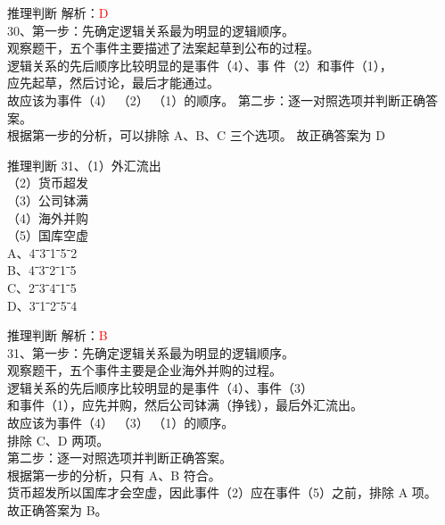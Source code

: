 \documentclass[aspectratio=169]{beamer}
\begin{document}
\begin{frame}[t]{推理判断}
    解析：\textcolor{red}{D}\\
    30、第一步：先确定逻辑关系最为明显的逻辑顺序。\\
    观察题干，五个事件主要描述了法案起草到公布的过程。\\
    逻辑关系的先后顺序比较明显的是事件（4）、事
    件（2）和事件（1），\\
    应先起草，然后讨论，最后才能通过。\\
    故应该为事件（4） （2） （1）的顺序。
    第二步：逐一对照选项并判断正确答案。\\
    根据第一步的分析，可以排除 A、B、C 三个选项。
    故正确答案为 D
\end{frame}


\begin{frame}[t]{推理判断}
    31、（1）外汇流出\\
    （2）货币超发\\
    （3）公司钵满\\
    （4）海外并购\\
    （5）国库空虚\\
    A、4ˉ3ˉ1ˉ5ˉ2\\
    B、4ˉ3ˉ2ˉ1ˉ5\\
    C、2ˉ3ˉ4ˉ1ˉ5\\
    D、3ˉ1ˉ2ˉ5ˉ4\\
\end{frame}


\begin{frame}[t]{推理判断}
    解析：\textcolor{red}{B}\\
    31、第一步：先确定逻辑关系最为明显的逻辑顺序。\\
    观察题干，五个事件主要是企业海外并购的过程。\\
    逻辑关系的先后顺序比较明显的是事件（4）、事件（3）\\
    和事件（1），应先并购，然后公司钵满（挣钱），最后外汇流出。\\
    故应该为事件（4） （3） （1）的顺序。\\
    排除 C、D 两项。\\
    第二步：逐一对照选项并判断正确答案。\\
    根据第一步的分析，只有 A、B 符合。\\
    货币超发所以国库才会空虚，因此事件（2）应在事件（5）之前，排除 A 项。\\
    故正确答案为 B。
\end{frame}
\end{document}
